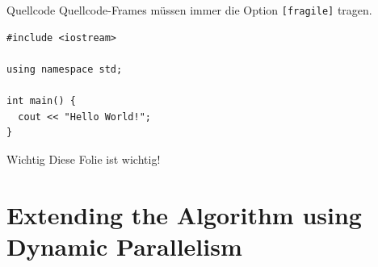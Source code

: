 \documentclass[fleqn,11pt,aspectratio=43]{beamer}
\begin{document}
\begin{frame}[fragile]{Quellcode}
Quellcode-Frames müssen immer die Option \texttt{[fragile]} tragen.
  \begin{verbatim}
#include <iostream>

using namespace std;

int main() {
  cout << "Hello World!";
}
  \end{verbatim}
\end{frame}


\begin{frame}[highlight]{Wichtig}
Diese Folie ist wichtig!
\end{frame}

\part{Extending the Algorithm using Dynamic Parallelism}

\begin{frame}
	\partpage
\end{frame}
\end{document}
